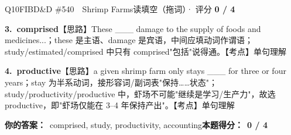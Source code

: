 \begin{qblock}{Q10\quad FIBD\&D \#540\ \ Shrimp Farms}{读填空（拖词）· 评分 \textcolor{cAccent}{\bfseries 0 / 4}}
\begin{notebox}
\textbf{3.\ comprised}\quad【思路】These \_\_\_ damage to the supply of foods and medicines...；these 是主语、damage 是宾语，中间应填动词作谓语；study/estimated/comprised 中只有 comprised"包括"说得通。【考点】单句理解\par\smallskip
\textbf{4.\ productive}\quad【思路】a given shrimp farm only stays \_\_\_ for three or four years；stay 为半系动词，接形容词/副词表"保持……状态"；study/productivity/productive 中，虾场不可能"继续是学习/生产力"，故选 productive，即"虾场仅能在 3--4 年保持产出"。【考点】单句理解
\end{notebox}
\smallskip
\textbf{你的答案：}\ {\color{cWrong}comprised, study, productivity, accounting}\qquad\textbf{本题得分：}\ {\color{cAccent}\bfseries 0 / 4}
\end{qblock}

